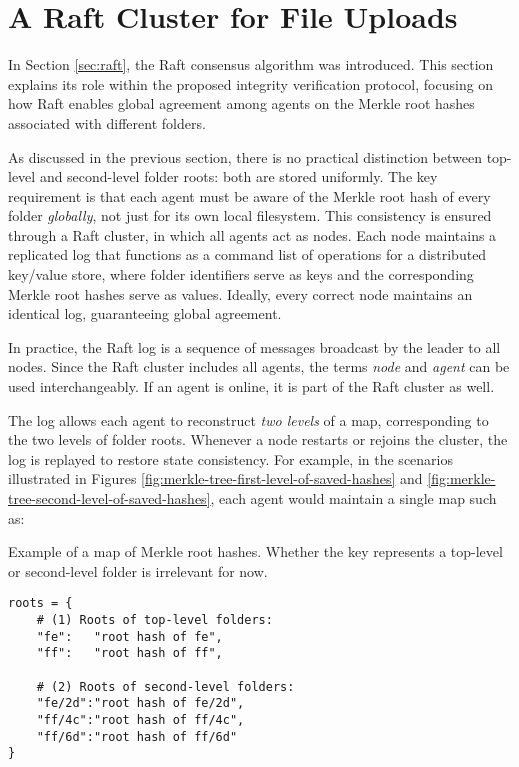 \section{A Raft Cluster for File Uploads} \label{sec:raft-cluster-for-file-uploads}

In Section \ref{sec:raft}, the Raft consensus algorithm was introduced. This
section explains its role within the proposed integrity verification protocol, focusing on how Raft enables global agreement among agents on the Merkle root hashes associated with different folders.

As discussed in the previous section, there is no practical distinction between top-level and second-level folder roots: both are stored uniformly. The key requirement is that each agent must be aware of the Merkle root hash of every folder \emph{globally}, not just for its own local filesystem. This consistency is ensured through a Raft cluster, in which all agents act as nodes. Each node maintains a replicated log that functions as a command list of operations for a distributed key/value store, where folder identifiers serve as keys and the corresponding Merkle root hashes serve as values. Ideally, every correct node maintains an identical log, guaranteeing global agreement.

In practice, the Raft log is a sequence of messages broadcast by the leader to all nodes. Since the Raft cluster includes all agents, the terms \emph{node} and \emph{agent} can be used interchangeably. If an agent is online, it is part of the Raft cluster as well.

The log allows each agent to reconstruct \emph{two levels} of a map, corresponding to the two levels of folder roots. Whenever a node restarts or rejoins the cluster, the log is replayed to restore state consistency. For example, in the scenarios illustrated in Figures \ref{fig:merkle-tree-first-level-of-saved-hashes} and \ref{fig:merkle-tree-second-level-of-saved-hashes}, each agent would maintain a single map such as:

\begin{listing}[H]
\caption{Example of a map of Merkle root hashes. Whether the key represents a top-level or second-level folder is irrelevant for now.}
\label{code:map-of-roots}
\begin{verbatim}
roots = {
    # (1) Roots of top-level folders:
    "fe":   "root hash of fe",
    "ff":   "root hash of ff",
    
    # (2) Roots of second-level folders:
    "fe/2d":"root hash of fe/2d",
    "ff/4c":"root hash of ff/4c",
    "ff/6d":"root hash of ff/6d"
}
\end{verbatim}
\end{listing}

